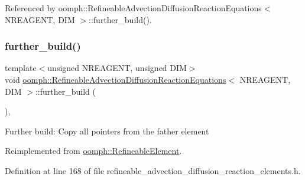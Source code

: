 Referenced by oomph\+::\+Refineable\+Advection\+Diffusion\+Reaction\+Equations$<$ N\+R\+E\+A\+G\+E\+N\+T, D\+I\+M $>$\+::further\+\_\+build().

\mbox{\label{classoomph_1_1RefineableAdvectionDiffusionReactionEquations_aed29fbe38b879562939f96c9403bad50}} 
\subsubsection{\texorpdfstring{further\+\_\+build()}{further\_build()}}
{\footnotesize\ttfamily template$<$unsigned N\+R\+E\+A\+G\+E\+NT, unsigned D\+IM$>$ \\
void \hyperlink{classoomph_1_1RefineableAdvectionDiffusionReactionEquations}{oomph\+::\+Refineable\+Advection\+Diffusion\+Reaction\+Equations}$<$ N\+R\+E\+A\+G\+E\+NT, D\+IM $>$\+::further\+\_\+build (\begin{DoxyParamCaption}{ }\end{DoxyParamCaption})\hspace{0.3cm}{\ttfamily [inline]}, {\ttfamily [virtual]}}

Further build\+: Copy all pointers from the father element 

Reimplemented from \hyperlink{classoomph_1_1RefineableElement_a26628ce36dfad028686adeb4694a9ef3}{oomph\+::\+Refineable\+Element}.



Definition at line 168 of file refineable\+\_\+advection\+\_\+diffusion\+\_\+reaction\+\_\+elements.\+h.



